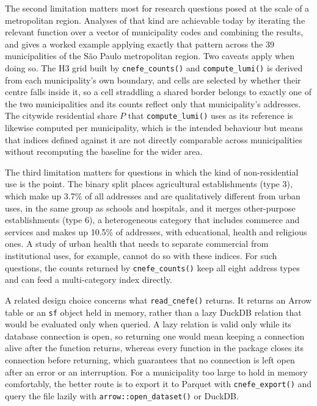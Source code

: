 The second limitation matters most for research questions posed at the
scale of a metropolitan region. Analyses of that kind are achievable
today by iterating the relevant function over a vector of municipality
codes and combining the results, and \citet{pedreirajr2026} gives a worked
example applying exactly that pattern across the 39 municipalities of
the São Paulo metropolitan region. Two caveats apply when doing so. The
H3 grid built by \texttt{cnefe\_counts()} and \texttt{compute\_lumi()} is derived from
each municipality's own boundary, and cells are selected by whether
their centre falls inside it, so a cell straddling a shared border
belongs to exactly one of the two municipalities and its counts reflect
only that municipality's addresses. The citywide residential share \(P\)
that \texttt{compute\_lumi()} uses as its reference is likewise computed per
municipality, which is the intended behaviour but means that indices
defined against it are not directly comparable across municipalities
without recomputing the baseline for the wider area.

The third limitation matters for questions in which the kind of
non-residential use is the point. The binary split places agricultural
establishments (type 3), which make up 3.7\% of all addresses and are
qualitatively different from urban uses, in the same group as schools
and hospitals, and it merges other-purpose establishments (type 6), a
heterogeneous category that includes commerce and services and makes up
10.5\% of addresses, with educational, health and religious ones. A
study of urban health that needs to separate commercial from
institutional uses, for example, cannot do so with these indices. For
such questions, the counts returned by \texttt{cnefe\_counts()} keep all eight
address types and can feed a multi-category index directly.

A related design choice concerns what \texttt{read\_cnefe()} returns. It
returns an Arrow table or an \texttt{sf} object held in memory, rather than a
lazy DuckDB relation that would be evaluated only when queried. A lazy
relation is valid only while its database connection is open, so
returning one would mean keeping a connection alive after the function
returns, whereas every function in the package closes its connection
before returning, which guarantees that no connection is left open after
an error or an interruption. For a municipality too large to hold in
memory comfortably, the better route is to export it to Parquet with
\texttt{cnefe\_export()} and query the file lazily with \texttt{arrow::open\_dataset()}
or DuckDB.


